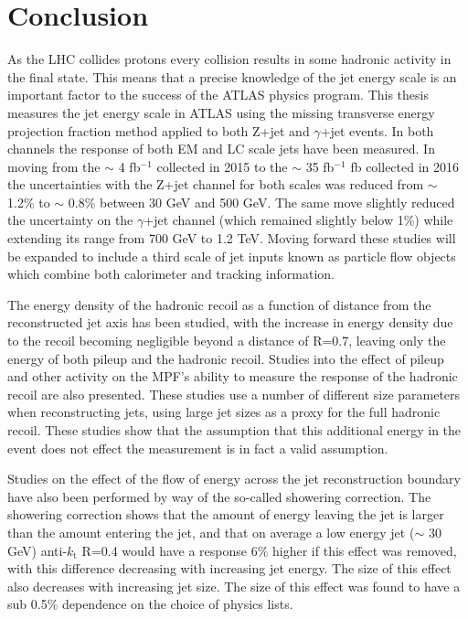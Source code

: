 \chapter{Conclusion}

As the LHC collides protons every collision results in some hadronic activity in the final state.  
This means that a precise knowledge of the jet energy scale is an important factor to the success of the ATLAS physics program.  
This thesis measures the jet energy scale in ATLAS using the missing transverse energy projection fraction method applied to both Z+jet and $\gamma$+jet events.  
In both channels the response of both EM and LC scale jets have been measured.  
In moving from the $\sim$ 4 fb$^{-1}$ collected in 2015 to the $\sim$ 35 fb$^{-1}$ fb collected in 2016 the uncertainties with the Z+jet channel for both scales was reduced from $\sim$ 1.2\% to $\sim$ 0.8\% between 30 GeV and 500 GeV.   
The same move slightly reduced the uncertainty on the $\gamma$+jet channel (which remained slightly below 1\%) while extending its range from 700 GeV to 1.2 TeV.  
Moving forward these studies will be expanded to include a third scale of jet inputs known as particle flow objects which combine both calorimeter and tracking information.  

The energy density of the hadronic recoil as a function of distance from the reconstructed jet axis has been studied, with the increase in energy density due to the recoil becoming negligible beyond a distance of R=0.7, leaving only the energy of both pileup and the hadronic recoil.  
Studies into the effect of pileup and other activity on the MPF's ability to measure the response of the hadronic recoil are also presented.  
These studies use a number of different size parameters when reconstructing jets, using large jet sizes as a proxy for the full hadronic recoil.  
These studies show that the assumption that this additional energy in the event does not effect the measurement is in fact a valid assumption.  


Studies on the effect of the flow of energy across the jet reconstruction boundary have also been performed by way of the so-called showering correction.  
The showering correction shows that the amount of energy leaving the jet is larger than the amount entering the jet, and that on average a low energy jet ($\sim$ 30 GeV) anti-$k_\mathrm{t}$ R=0.4 would have a response 6\% higher if this effect was removed, with this difference decreasing with increasing jet energy.  
The size of this effect also decreases with increasing jet size.  
The size of this effect was found to have a sub 0.5\% dependence on the choice of physics lists.  

